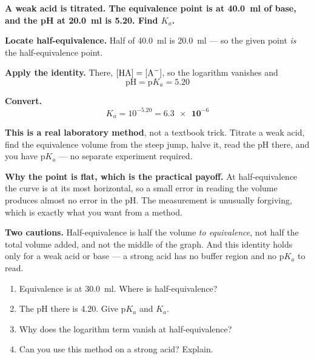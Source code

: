 \documentclass{apchem-worksheet}
\begin{document}
\begin{workedexample}
\textbf{A weak acid is titrated. The equivalence point is at
\SI{40.0}{\milli\litre} of base, and the pH at
\SI{20.0}{\milli\litre} is 5.20. Find $K_{a}$.}

\textbf{Locate half-equivalence.} Half of \SI{40.0}{\milli\litre} is
\SI{20.0}{\milli\litre} --- so the given point \emph{is} the
half-equivalence point.

\textbf{Apply the identity.} There, $[\ce{HA}] = [\ce{A-}]$, so the
logarithm vanishes and
\[ \text{pH} = \text{p}K_{a} = 5.20 \]

\textbf{Convert.}
\[ K_{a} = 10^{-5.20} = \mathbf{\num{6.3e-6}} \]

\textbf{This is a real laboratory method}, not a textbook trick. Titrate
a weak acid, find the equivalence volume from the steep jump, halve it,
read the pH there, and you have p$K_{a}$ --- no separate experiment
required.

\textbf{Why the point is flat, which is the practical payoff.} At
half-equivalence the curve is at its most horizontal, so a small error
in reading the volume produces almost no error in the pH. The
measurement is unusually forgiving, which is exactly what you want from
a method.

\textbf{Two cautions.} Half-equivalence is half the volume \emph{to
equivalence}, not half the total volume added, and not the middle of the
graph. And this identity holds only for a weak acid or base --- a strong
acid has no buffer region and no p$K_{a}$ to read.
\end{workedexample}

\begin{yourturn}
\begin{enumerate}[leftmargin=*,itemsep=0.5em]
  \item Equivalence is at \SI{30.0}{\milli\litre}. Where is
        half-equivalence? \workspace[1.4cm]
  \item The pH there is 4.20. Give p$K_{a}$ and $K_{a}$.
        \workspace[1.8cm]
  \item Why does the logarithm term vanish at half-equivalence?
        \workspace[1.8cm]
  \item Can you use this method on a strong acid? Explain.
        \workspace[1.8cm]
\end{enumerate}
\end{yourturn}
\end{document}
